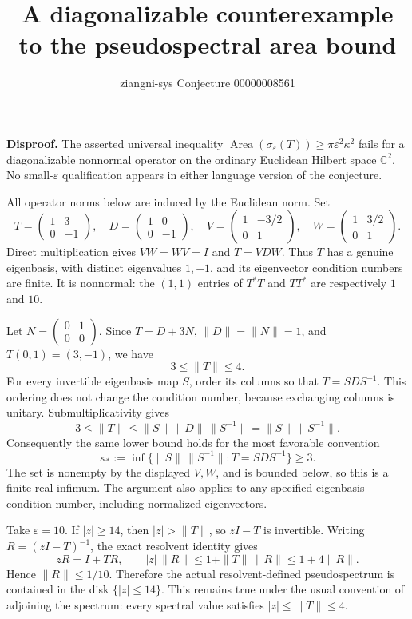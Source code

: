 \documentclass[11pt]{article}
\title{A diagonalizable counterexample to the pseudospectral area bound}
\author{ziangni-sys \quad Conjecture 00000008561}
\date{}
\begin{document}
\maketitle
\vspace{-2em}
\textbf{Disproof.} The asserted universal inequality
$\operatorname{Area}(\sigma_\varepsilon(T))\geq\pi\varepsilon^2\kappa^2$
fails for a diagonalizable nonnormal operator on the ordinary Euclidean Hilbert space $\mathbb C^2$. No small-$\varepsilon$ qualification appears in either language version of the conjecture.

All operator norms below are induced by the Euclidean norm. Set
\[
 T=\begin{pmatrix}1&3\\0&-1\end{pmatrix},\quad
 D=\begin{pmatrix}1&0\\0&-1\end{pmatrix},\quad
 V=\begin{pmatrix}1&-3/2\\0&1\end{pmatrix},\quad
 W=\begin{pmatrix}1&3/2\\0&1\end{pmatrix}.
\]
Direct multiplication gives $VW=WV=I$ and $T=VDW$. Thus $T$ has a genuine eigenbasis, with distinct eigenvalues $1,-1$, and its eigenvector condition numbers are finite. It is nonnormal: the $(1,1)$ entries of $T^*T$ and $TT^*$ are respectively $1$ and $10$.

Let $N=\left(\begin{smallmatrix}0&1\\0&0\end{smallmatrix}\right)$. Since $T=D+3N$, $\|D\|=\|N\|=1$, and $T(0,1)=(3,-1)$, we have
\[
 3\leq\|T\|\leq4.
\]
For every invertible eigenbasis map $S$, order its columns so that $T=SDS^{-1}$. This ordering does not change the condition number, because exchanging columns is unitary. Submultiplicativity gives
\[
 3\leq\|T\|\leq\|S\|\,\|D\|\,\|S^{-1}\|
 =\|S\|\,\|S^{-1}\|.
\]
Consequently the same lower bound holds for the most favorable convention
\[
 \kappa_*:=\inf\{\|S\|\,\|S^{-1}\|: T=SDS^{-1}\}\geq3.
\]
The set is nonempty by the displayed $V,W$, and is bounded below, so this is a finite real infimum. The argument also applies to any specified eigenbasis condition number, including normalized eigenvectors.

Take $\varepsilon=10$. If $|z|\geq14$, then $|z|>\|T\|$, so $zI-T$ is invertible. Writing $R=(zI-T)^{-1}$, the exact resolvent identity gives
\[
 zR=I+TR,\qquad
 |z|\,\|R\|\leq1+\|T\|\,\|R\|\leq1+4\|R\|.
\]
Hence $\|R\|\leq1/10$. Therefore the actual resolvent-defined pseudospectrum is contained in the disk $\{|z|\leq14\}$. This remains true under the usual convention of adjoining the spectrum: every spectral value satisfies $|z|\leq\|T\|\leq4$.
\end{document}
